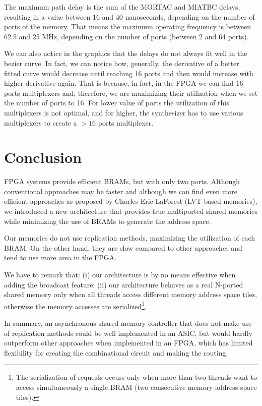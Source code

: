 \documentclass[conference,a4paper]{IEEEtran}
\begin{document}
The maximum path delay is the sum of the MORTAC and MIATBC delays, resulting in a value between 16 and 40 nanoseconds, depending on the number of ports of the memory. That means the maximum operating frequency is between 62.5 and 25 MHz, depending on the number of ports (between 2 and 64 ports).

We can also notice in the graphics that the delays do not always fit well in the bezier curve. In fact, we can notice how, generally, the derivative of a better fitted curve would decrease until reaching 16 ports and then would increase with higher derivative again. That is because, in fact, in the FPGA we can find 16 ports multiplexers and, therefore, we are maximizing their utilization when we set the number of ports to 16. For lower value of ports the utilization of this multiplexers is not optimal, and for higher, the synthesizer has to use various multiplexers to create a $>16$ ports multiplexer.



\vspace{7pt}
\section{Conclusion}
FPGA systems provide efficient BRAMs, but with only two ports. Although conventional approaches may be faster and although we can find even more efficient approaches as proposed by Charles Eric LaForest (LVT-based memories), we introduced a new architecture that provides true multiported shared memories while minimizing the use of BRAMs to generate the address space.

Our memories do not use replication methods, maximizing the utilization of each BRAM. On the other hand, they are slow compared to other approaches and tend to use more area in the FPGA.

We have to remark that: (i) our architecture is by no means effective when adding the broadcast feature; (ii) our architecture behaves as a real N-ported shared memory only when all threads access different memory address space tiles, otherwise the memory accesses are serialized\footnote{The serialization of requests occurs only when more than two threads want to access simultaneously a single BRAM (two consecutive memory address space tiles).}.

In summary, an asynchronous shared memory controller that does not make use of replication methods could be well implemented in an ASIC, but would hardly outperform other approaches when implemented in an FPGA, which has limited flexibility for creating the combinational circuit and making the routing.
\end{document}
